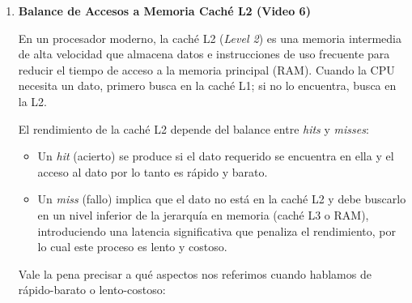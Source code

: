 \begin{enumerate}[label=\arabic*., leftmargin=*]
    \item \textbf{Balance de Accesos a Memoria Caché L2 (Video 6)}

    En un procesador moderno, la caché L2 (\textit{Level 2}) es una memoria intermedia de alta velocidad que almacena datos e instrucciones de uso frecuente para reducir el tiempo de acceso a la memoria principal (RAM). Cuando la CPU necesita un dato, primero busca en la caché L1; si no lo encuentra, busca en la L2.

    El rendimiento de la caché L2 depende del balance entre \textit{hits} y \textit{misses}:
    \begin{itemize}[leftmargin=*]
        \item Un \textit{hit} (acierto) se produce si el dato requerido se encuentra en ella y el acceso al dato por lo tanto es rápido y barato.
        \item Un \textit{miss} (fallo) implica que el dato no está en la caché L2 y debe buscarlo en un nivel inferior de la jerarquía en memoria (caché L3 o RAM), introduciendo una latencia significativa que penaliza el rendimiento, por lo cual este proceso es lento y costoso.
    \end{itemize}

    Vale la pena precisar a qué aspectos nos referimos cuando hablamos de rápido-barato o lento-costoso:

    \vspace{0.3cm}
    \begin{center}
    \end{center}
    \vspace{0.3cm}


\end{enumerate}

